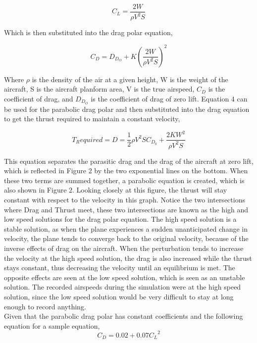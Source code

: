 \documentclass[letterpaper,11pt]{texMemo}
\begin{document}
\begin{equation}
   C_{L} = \frac{2W}{\rho V^2 S} 
	\label{equation:coefficentLift}
\end{equation}

Which is then substituted into the drag polar equation,

\begin{equation}
    C_D = D_{D_{O}} + K (\frac{2W}{\rho V^2 S})^2
	\label{equation:dragPolar}
\end{equation}

Where \(\rho\) is the density of the air at a given height, W is the weight of the aircraft, S is the aircraft planform area, V is the true airspeed, \(C_D\) is the coefficient of drag, and \(D_{D_{O}}\) is the coefficient of drag of zero lift. Equation 4 can be used for the parabolic drag polar and then substituted into the drag equation to get the thrust required to maintain a constant velocity,

\begin{equation}
    T_Required=D=\frac{1}{2} \rho V^2 S C_{D_{0}}+\frac{2KW^2}{\rho V^2 S}
	\label{equation:drag}
\end{equation}

This equation separates the parasitic drag and the drag of the aircraft at zero lift, which is reflected in Figure 2 by the two exponential lines on the bottom. When these two terms are summed together, a parabolic equation is created, which is also shown in Figure 2. Looking closely at this figure, the thrust will stay constant with respect to the velocity in this graph. Notice the two intersections where Drag and Thrust meet, these two intersections are known as the high and low speed solutions for the drag polar equation. The high speed solution is a stable solution, as when the plane experiences a sudden unanticipated change in velocity, the plane tends to converge back to the original velocity, because of the inverse effects of drag on the aircraft. When the perturbation tends to increase the velocity at the high speed solution, the drag is also increased while the thrust stays constant, thus decreasing the velocity until an equilibrium is met. The opposite effects are seen at the low speed solution, which is seen as an unstable solution. The recorded airspeeds during the simulation were at the high speed solution, since the low speed solution would be very difficult to stay at long enough to record anything.
\\ 
Given that the parabolic drag polar has constant coefficients and the following equation for a sample equation, 
\begin{equation}
    C_D = 0.02 + 0.07 {C_{L}}^2
	\label{equation:coeffdrag}
\end{equation}
\end{document}
